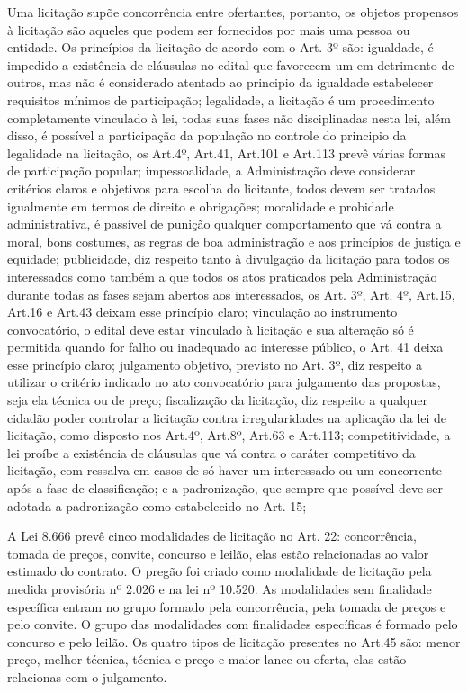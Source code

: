 Uma licitação supõe concorrência entre ofertantes, portanto, os objetos propensos à licitação são aqueles que podem ser fornecidos por mais uma pessoa ou entidade. Os princípios da licitação de acordo com o Art. 3º são: igualdade, é impedido a existência de cláusulas no edital que favorecem um em detrimento de outros, mas não é considerado atentado ao principio da igualdade estabelecer requisitos mínimos de participação; legalidade, a licitação é um procedimento completamente vinculado à lei, todas suas fases não disciplinadas nesta lei, além disso, é possível a participação da população no controle do principio da legalidade na licitação, os Art.4º, Art.41, Art.101 e Art.113 prevê várias formas de participação popular; impessoalidade, a Administração deve considerar critérios claros e objetivos para escolha do licitante, todos devem ser tratados igualmente em termos de direito e obrigações; moralidade e probidade administrativa, é passível de punição qualquer comportamento que vá contra a moral, bons costumes, as regras de boa administração e aos princípios de justiça e equidade; publicidade, diz respeito tanto à divulgação da licitação para todos os interessados como também a que todos os atos praticados pela Administração durante todas as fases sejam abertos aos interessados, os Art. 3º, Art. 4º, Art.15, Art.16 e Art.43 deixam esse princípio claro; vinculação ao instrumento convocatório,  o edital deve estar vinculado à licitação e sua alteração só é permitida quando for falho ou inadequado ao interesse público, o Art. 41 deixa esse princípio claro; julgamento objetivo, previsto no Art. 3º, diz respeito a utilizar o critério indicado no ato convocatório para julgamento das propostas, seja ela técnica ou de preço; fiscalização da licitação, diz respeito a qualquer cidadão poder controlar a licitação contra irregularidades na aplicação da lei de licitação, como disposto nos Art.4º, Art.8º, Art.63 e Art.113; competitividade, a lei proíbe a existência de cláusulas que vá contra o caráter competitivo da licitação, com ressalva em casos de só haver um interessado ou um concorrente após a fase de classificação; e a padronização, que sempre que possível deve ser adotada a padronização como estabelecido no Art. 15; 

A Lei 8.666 prevê cinco modalidades de licitação no Art. 22: concorrência, tomada de preços, convite, concurso e leilão, elas estão relacionadas ao valor estimado do contrato. O pregão foi criado como modalidade de licitação pela medida provisória nº 2.026 e na lei nº 10.520. As modalidades sem finalidade específica entram no grupo formado pela concorrência, pela tomada de preços e pelo convite. O grupo das modalidades com finalidades específicas é formado pelo concurso e pelo leilão. Os quatro tipos de licitação presentes no Art.45 são: menor preço, melhor técnica, técnica e preço e maior lance ou oferta, elas estão relacionas com o julgamento.

